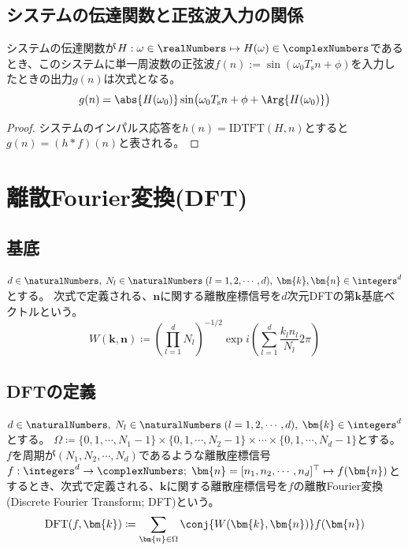 			\section{システムの伝達関数と正弦波入力の関係}
				\begin{shadebox}
					システムの伝達関数が$H:\omega\in\realNumbers\mapsto H(\omega)\in\complexNumbers$であるとき、このシステムに単一周波数の正弦波$f(n) := \sin(\omega_0 T_\text{s}n + \phi)$を入力したときの出力$g(n)$は次式となる。
					\[ g(n) = \abs{H(\omega_0)}\sin\bigl(\omega_0 T_\text{s}n + \phi + \Arg{H(\omega_0)}\bigr) \]
				\end{shadebox}
				\begin{proof}
					システムのインパルス応答を$h(n) = \text{IDTFT}(H,n)$とすると$g(n) = (h*f)(n)$と表される。
				\end{proof}
		\chapter{離散Fourier変換(DFT)}
			\section{基底}
				$d\in\naturalNumbers,\;N_l\in\naturalNumbers\;(l=1,2,\cdots,d),\;\bm{k},\bm{n}\in\integers^d$とする。
				次式で定義される、$\bm{n}$に関する離散座標信号を$d$次元DFTの第$\bm{k}$基底ベクトルという。
				\[ W(\bm{k},\bm{n}) \coloneqq \left(\prod_{l=1}^d N_l\right)^{-1/2} \exp i\left(\sum_{l=1}^d \frac{k_l n_l}{N_l}2\pi\right)\]

			\section{DFTの定義}
				\label{DFTの定義}
				$d\in\naturalNumbers,\;N_l\in\naturalNumbers\;(l=1,2,\cdots,d),\;\bm{k}\in\integers^d$とする。
				$\Omega \coloneqq \{0,1,\cdots,N_1-1\}\times\{0,1,\cdots,N_2-1\}\times\cdots\times\{0,1,\cdots,N_d-1\}$とする。
				$f$を周期が$(N_1,N_2,\cdots,N_d)$であるような離散座標信号$f: \integers^d\to\complexNumbers;\;\bm{n} = [n_1,n_2,\cdots,n_d]^\top \mapsto f(\bm{n})$とするとき、次式で定義される、$\bm{k}$に関する離散座標信号を$f$の離散Fourier変換(Discrete Fourier Transform; DFT)という。
				\[ \text{DFT}(f,\bm{k}) \coloneqq \sum_{\bm{n}\in\Omega} \conj{W(\bm{k},\bm{n})} f(\bm{n}) \]

